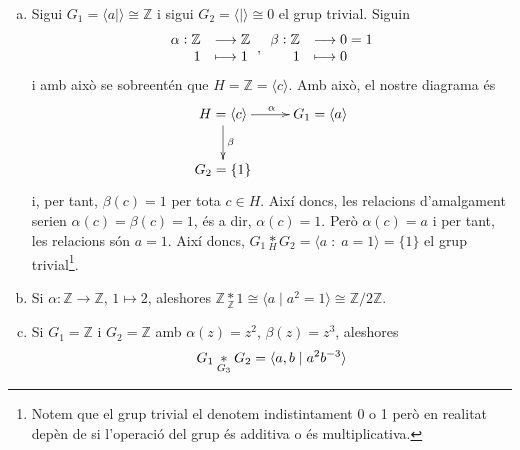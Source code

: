 \documentclass[../main.tex]{subfiles}
\begin{document}
\begin{ej}
\begin{enumerate}[(a)]
    \item Sigui $G_1 = \langle a|\rangle\cong \mathbb{Z}$ i sigui $G_2 = \langle\mid\rangle\cong 0$ el grup trivial. Siguin
    \begin{equation}
        \notag
        \begin{array}{rl}
            \alpha:\mathbb{Z} & \longrightarrow\mathbb{Z} \\
            1 & \longmapsto 1
        \end{array},\begin{array}{rl}
            \beta:\mathbb{Z} & \longrightarrow 0=1 \\
            1 & \longmapsto 0
        \end{array}
    \end{equation}
    i amb això se sobreentén que $H = \mathbb{Z} = \langle c\rangle$. Amb això, el nostre diagrama és
    \begin{equation}
        \notag
        \xymatrix{
        H = \langle c\rangle \ar[r]^\alpha \ar[d]^\beta & G_1 = \langle a\rangle\\
        G_2 = \{1\}
        }
    \end{equation}
    i, per tant, $\beta(c) = 1$ per tota $c\in H$. Així doncs, les relacions d'amalgament serien $\alpha(c) = \beta(c) = 1$, és a dir, $\alpha(c) = 1$. Però $\alpha(c) = a$ i per tant, les relacions són $a = 1$. Així doncs, $G_1\underset{H}{*}G_2 = \langle a\;:\;a=1\rangle = \{1\}$ el grup trivial\footnote{Notem que el grup trivial el denotem indistintament 0 o 1 però en realitat depèn de si l'operació del grup és additiva o és multiplicativa.}.
    \item Si $\alpha:\mathbb{Z}\rightarrow \mathbb{Z}$, $1\mapsto 2$, aleshores $\mathbb{Z}\underset{\mathbb{Z}}{*}1\cong \langle a\mid a^2=1\rangle\cong \mathbb{Z}/2\mathbb{Z}$.
    \item Si $G_1 = \mathbb{Z}$ i $G_2 = \mathbb{Z}$ amb $\alpha(z) =z^2$, $\beta(z)=z^3$, aleshores
    \begin{equation}
        \notag
        G_1\underset{G_3}{*}G_2 = \langle a,b\mid a^2b^{-3}\rangle
    \end{equation}
\end{enumerate}
\end{ej}
\end{document}

